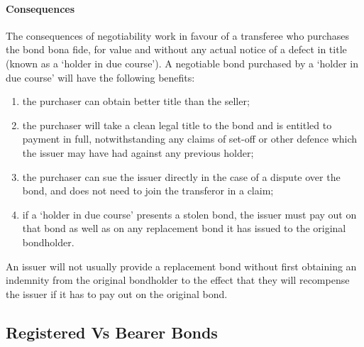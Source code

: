 \documentclass[
]{article}
\newenvironment{Shaded}{}{}
\newcommand{\NormalTok}[1]{#1}
\providecommand{\tightlist}{%
  \setlength{\itemsep}{0pt}\setlength{\parskip}{0pt}}
\begin{document}
\hypertarget{consequences}{%
\paragraph{Consequences}\label{consequences}}

The consequences of negotiability work in favour of a transferee who
purchases the bond bona fide, for value and without any actual notice of
a defect in title (known as a `holder in due course'). A negotiable bond
purchased by a `holder in due course' will have the following benefits:

\begin{enumerate}
\def\labelenumi{\arabic{enumi}.}
\tightlist
\item
  the purchaser can obtain better title than the seller;
\item
  the purchaser will take a clean legal title to the bond and is
  entitled to payment in full, notwithstanding any claims of set-off or
  other defence which the issuer may have had against any previous
  holder;
\item
  the purchaser can sue the issuer directly in the case of a dispute
  over the bond, and does not need to join the transferor in a claim;
\item
  if a `holder in due course' presents a stolen bond, the issuer must
  pay out on that bond as well as on any replacement bond it has issued
  to the original bondholder.
\end{enumerate}

\begin{Shaded}
\begin{Highlighting}[]
\NormalTok{An issuer will not usually provide a replacement bond without first obtaining an indemnity from the original bondholder to the effect that they will recompense the issuer if it has to pay out on the original bond.}
\end{Highlighting}
\end{Shaded}

\hypertarget{registered-vs-bearer-bonds}{%
\subsection{Registered Vs Bearer
Bonds}\label{registered-vs-bearer-bonds}}
\end{document}
